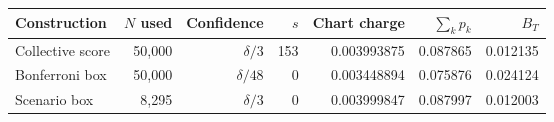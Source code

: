 \begin{tabular}{lrrrrrr}
\toprule
Construction & $N$ used & Confidence & $s$ & Chart charge & $\sum_k p_k$ & $B_T$ \\
\midrule
Collective score & 50,000 & $\delta/3$ & 153 & 0.003993875 & 0.087865 & 0.012135 \\
Bonferroni box & 50,000 & $\delta/48$ & 0 & 0.003448894 & 0.075876 & 0.024124 \\
Scenario box & 8,295 & $\delta/3$ & 0 & 0.003999847 & 0.087997 & 0.012003 \\
\bottomrule
\end{tabular}
